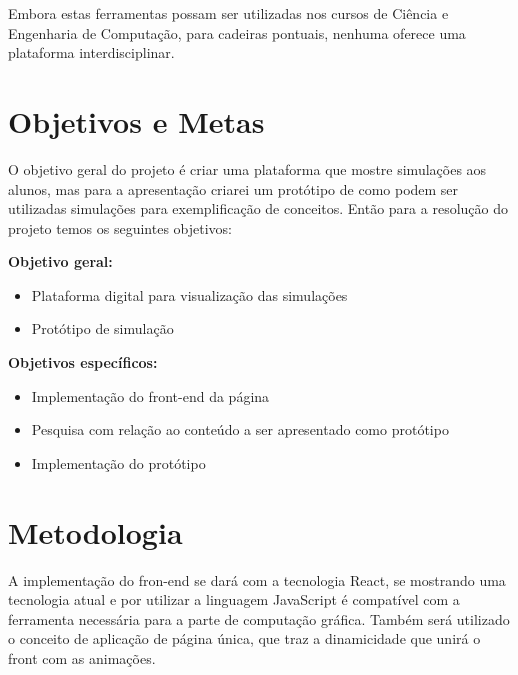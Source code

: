 \documentclass[tcc-proposta]{texufpel}
\begin{document}
Embora estas ferramentas possam ser utilizadas nos cursos de Ciência e Engenharia de Computação, para cadeiras pontuais, nenhuma oferece uma plataforma interdisciplinar. 

\chapter{Objetivos e Metas}
O objetivo geral do projeto é criar uma plataforma que mostre simulações aos alunos, mas para a apresentação criarei um protótipo de como podem ser utilizadas simulações para exemplificação de conceitos. Então para a resolução do projeto temos os seguintes objetivos:\newline

\textbf{Objetivo geral:}
\begin{itemize}
    \item Plataforma digital para visualização das simulações
    \item Protótipo de simulação
\end{itemize}

\textbf{Objetivos específicos:}
\begin{itemize}
    \item Implementação do front-end da página
    \item Pesquisa com relação ao conteúdo a ser apresentado como protótipo
    \item Implementação do protótipo
\end{itemize}
    
\chapter{Metodologia}
A implementação do fron-end se dará com a tecnologia React, se mostrando uma tecnologia atual e por utilizar a linguagem JavaScript é compatível com a ferramenta necessária para a parte de computação gráfica. Também será utilizado o conceito de aplicação de página única, que traz a dinamicidade que unirá o front com as animações.
\end{document}
